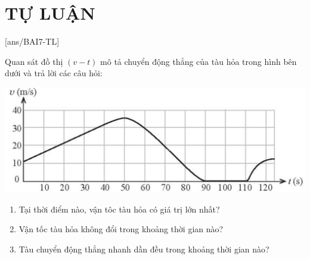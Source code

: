 \section{TỰ LUẬN}
[ans/BAI7-TL]
\setcounter{ex}{0}
\begin{ex}
	Quan sát đồ thị $\left(v-t\right)$ mô tả chuyển động thẳng của tàu hỏa trong hình bên dưới và trả lời các câu hỏi:
	\begin{center}
		\includegraphics[width=0.65\linewidth]{figs/BAI7-1}
	\end{center}
	\begin{enumerate}[label=\alph*)]
		\item Tại thời điểm nào, vận tôc tàu hỏa có giá trị lớn nhất?
		\item Vận tốc tàu hỏa không đổi trong khoảng thời gian nào?
		\item Tàu chuyển động thẳng nhanh dần đều trong khoảng thời gian nào?
	\end{enumerate}
	\loigiai{}
\end{ex}

